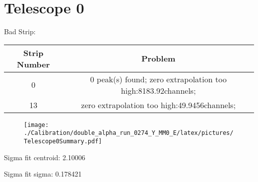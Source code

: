 \documentclass[a4paper,6pt]{article}
\begin{document}
\section{Telescope 0 }
 Bad Strip:
\begin{center}
\begin{tabular}{ | c | c | } 
\hline 
 Strip Number & Problem \\ \hline 
0 &  0 peak(s) found; zero extrapolation too high:8183.92channels;  \\ \hline 
13 &  zero extrapolation too high:49.9456channels;  \\ \hline 
\end{tabular} 
\end{center}
\begin{figure}[htcb!]
\begin{center}
\texttt{[image: ./Calibration/double\_alpha\_run\_0274\_Y\_MM0\_E/latex/pictures/Telescope0Summary.pdf]}
\end{center}
\end{figure}
\pagebreak
Sigma fit centroid: 2.10006

Sigma fit sigma: 0.178421
\end{document}
